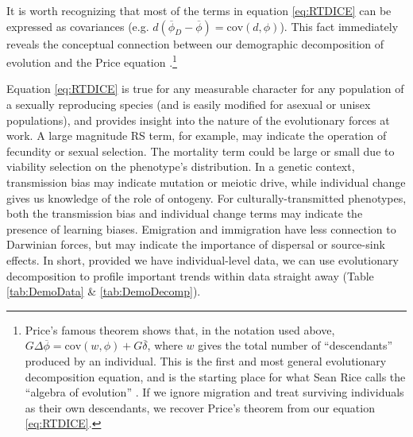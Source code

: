 \documentclass[11pt]{article}
\begin{document}
It is worth recognizing that most of the terms in equation \ref{eq:RTDICE} can be expressed as covariances (e.g. $d(\overline{\phi}_D - \overline{\phi}) = \mathrm{cov}(d,\phi)$).  This fact immediately reveals the conceptual connection between our demographic decomposition of evolution and the Price equation \citep{price1970selection}.\footnote{Price's famous theorem shows that, in the notation used above, $G \Delta \overline{\phi} = \mathrm{cov}(w, \phi) + G\overline{\delta}$, where $w$ gives the total number of ``descendants'' produced by an individual.  This is the first and most general evolutionary decomposition equation, and is the starting place for what Sean Rice calls the ``algebra of evolution'' \citep{rice2004evolutionary}. If we ignore migration and treat surviving individuals as their own descendants, we recover Price's theorem from our equation \ref{eq:RTDICE}.}

Equation \ref{eq:RTDICE} is true for any measurable character for any population of a sexually reproducing species (and is easily modified for asexual or unisex populations), and provides insight into the nature of the evolutionary forces at work.  A large magnitude RS term, for example, may indicate the operation of fecundity or sexual selection.  The mortality term could be large or small due to viability selection on the phenotype's distribution.  In a genetic context, transmission bias may indicate mutation or meiotic drive, while individual change gives us knowledge of the role of ontogeny.  For culturally-transmitted phenotypes, both the transmission bias and individual change terms may indicate the presence of learning biases.  Emigration and immigration have less connection to Darwinian forces, but may indicate the importance of dispersal or source-sink effects.  In short, provided we have individual-level data, we can use evolutionary decomposition to profile important trends within data straight away (Table \ref{tab:DemoData} \& \ref{tab:DemoDecomp}).  
\end{document}

